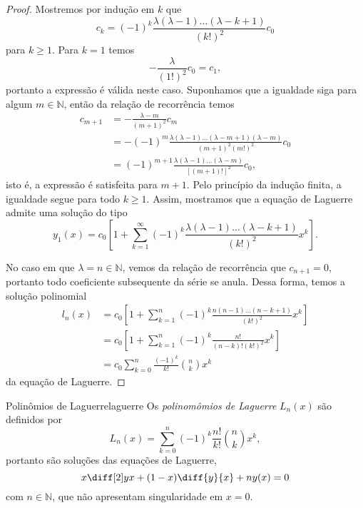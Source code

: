 \begin{proof}
    Mostremos por indução em \(k\) que
    \begin{equation*}
        c_k = (-1)^k \frac{\lambda (\lambda - 1) \dots (\lambda - k + 1)}{(k!)^2}c_0
    \end{equation*}
    para \(k \geq 1\). Para \(k = 1\) temos
    \begin{equation*}
        -\frac{\lambda}{(1!)^2}c_0 = c_1,
    \end{equation*}
    portanto a expressão é válida neste caso. Suponhamos que a igualdade siga para algum \(m \in \mathbb{N}\), então da relação de recorrência temos
    \begin{align*}
        c_{m+1} &= -\frac{\lambda - m}{(m+1)^2}c_m \\&= - (-1)^m\frac{\lambda(\lambda -1)\dots(\lambda - m +1)(\lambda - m)}{(m+1)^2 (m!)^2}c_0 \\&= (-1)^{m+1}\frac{\lambda (\lambda - 1)\dots (\lambda - m)}{[(m+1)!]^2}c_0,
    \end{align*}
    isto é, a expressão é satisfeita para \(m + 1\). Pelo princípio da indução finita, a igualdade segue para todo \(k \geq 1\). Assim, mostramos que a equação de Laguerre admite uma solução do tipo
    \begin{equation*}
        y_1(x) = c_0 \left[1 + \sum_{k = 1}^\infty (-1)^k\frac{\lambda (\lambda -1)\dots (\lambda - k + 1)}{(k!)^2}x^k\right].
    \end{equation*}

    No caso em que \(\lambda = n \in \mathbb{N}\), vemos da relação de recorrência que \(c_{n+1} = 0\), portanto todo coeficiente subsequente da série se anula. Dessa forma, temos a solução polinomial
    \begin{align*}
        l_n(x) &= c_0 \left[1 + \sum_{k = 1}^n (-1)^k\frac{n(n-1)\dots (n- k + 1)}{(k!)^2}x^k\right]\\
               &= c_0  \left[1 + \sum_{k = 1}^n (-1)^k\frac{n!}{(n-k)!(k!)^2}x^k\right]\\
               &= c_0  \sum_{k = 0}^n \frac{(-1)^k}{k!}\binom{n}{k}x^k
    \end{align*}
    da equação de Laguerre.
\end{proof}

\begin{definition}{Polinômios de Laguerre}{laguerre}
    Os \emph{polinomômios de Laguerre} \(L_n(x)\) são definidos por
    \begin{equation*}
        L_n(x) = \sum_{k = 0}^n (-1)^k \frac{n!}{k!} \binom{n}{k} x^k,
    \end{equation*}
    portanto são soluções das equações de Laguerre,
    \begin{equation*}
        x \diff[2]yx + (1-x)\diff{y}{x} + ny(x) = 0
    \end{equation*}
    com \(n \in \mathbb{N}\), que não apresentam singularidade em \(x = 0\).
\end{definition}

